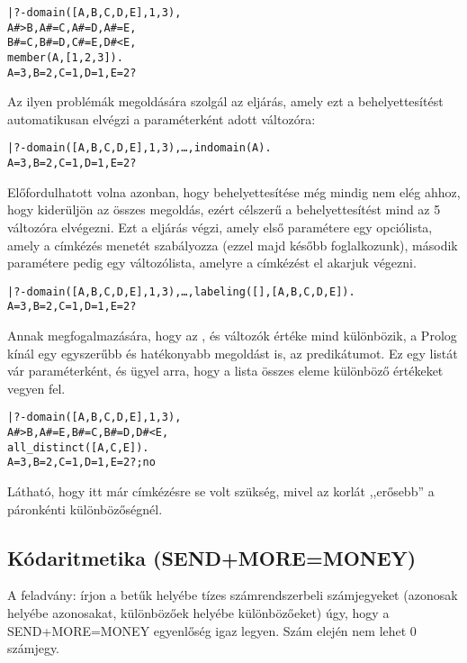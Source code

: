 \begin{alltt}
| ?- domain([A,B,C,D,E], 1, 3), 
     A #> B, A #\bs= C, A #\bs= D, A #\bs= E,
     B #\bs= C, B #\bs= D, C #\bs= E, D #< E,
     member(A, [1,2,3]).
A = 3, B = 2, C = 1, D = 1, E = 2 ?
\end{alltt}

Az ilyen problémák megoldására szolgál az  eljárás, amely
ezt a behelyettesítést automatikusan elvégzi a paraméterként adott változóra:

\begin{alltt}
| ?- domain([A,B,C,D,E], 1, 3), \ldots, indomain(A).
A = 3, B = 2, C = 1, D = 1, E = 2 ?
\end{alltt}

Előfordulhatott volna azonban, hogy  behelyettesítése még mindig
nem elég ahhoz, hogy kiderüljön az összes megoldás, ezért célszerű
a behelyettesítést mind az 5 változóra elvégezni. Ezt a 
eljárás végzi, amely első paramétere egy opciólista, amely a címkézés
menetét szabályozza (ezzel majd később foglalkozunk), második paramétere
pedig egy változólista, amelyre a címkézést el akarjuk végezni.

\begin{alltt}
| ?- domain([A,B,C,D,E], 1, 3), \ldots, labeling([],[A,B,C,D,E]).
A = 3, B = 2, C = 1, D = 1, E = 2 ?
\end{alltt}

Annak megfogalmazására, hogy az ,  és  változók értéke
mind különbözik, a Prolog kínál egy egyszerűbb és hatékonyabb megoldást is,
az  predikátumot. Ez egy listát vár paraméterként, és
ügyel arra, hogy a lista összes eleme különböző értékeket vegyen fel.

\begin{alltt}
| ?- domain([A,B,C,D,E], 1, 3),
     A #> B, A #\bs= E, B #\bs= C, B #\bs= D, D #< E,
     all_distinct([A,C,E]). 
A = 3, B = 2, C = 1, D = 1, E = 2 ? ; no
\end{alltt}

Látható, hogy itt már címkézésre se volt szükség, mivel az 
korlát ,,erősebb'' a páronkénti különbözőségnél.

\subsection{Kódaritmetika (SEND+MORE=MONEY)}

\label{sendmoremoney}

A feladvány: írjon a betűk helyébe tízes számrendszerbeli számjegyeket
(azonosak helyébe azonosakat, különbözőek helyébe különbözőeket) úgy, hogy a
SEND+MORE=MONEY egyenlőség igaz legyen. Szám elején nem lehet 0 számjegy.

